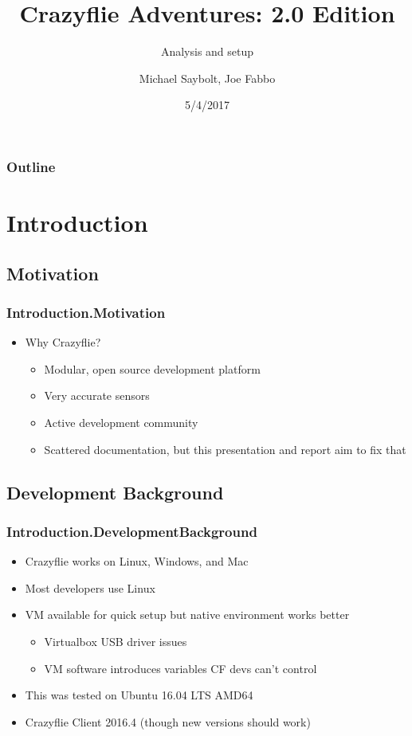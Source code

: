 \documentclass[t, xcolor=dvipsnames]{beamer}
\begin{document}
\begin{frame}
\title{Crazyflie Adventures: 2.0 Edition}
\subtitle{Analysis and setup}
\author{Michael Saybolt, Joe Fabbo}
\date{5/4/2017}
\titlepage
\end{frame}

\begin{frame}
	\frametitle{Outline}
	\tableofcontents
\end{frame}

\section{Introduction}
\subsection{Motivation}
\begin{frame}
	\frametitle{Introduction.Motivation}
	\begin{itemize}
		\item{Why Crazyflie?}
		\begin{itemize}
			\item Modular, open source development platform
			\item Very accurate sensors
			\item Active development community
			\item Scattered documentation, but this presentation and report aim to fix that
		\end{itemize}
	\end{itemize} %
\end{frame}

\subsection{Development Background}
\begin{frame} %
	\frametitle{Introduction.DevelopmentBackground}
	\begin{itemize}
		\item{Crazyflie works on Linux, Windows, and Mac}
		\item{Most developers use Linux}
		\item VM available for quick setup but native environment works better
			\begin{itemize}
				\item Virtualbox USB driver issues
				\item VM software introduces variables CF devs can't control
			\end{itemize}
		\item{This was tested on Ubuntu 16.04 LTS AMD64}
		\item Crazyflie Client 2016.4 (though new versions should work)
	\end{itemize}
\end{frame}
\end{document}
